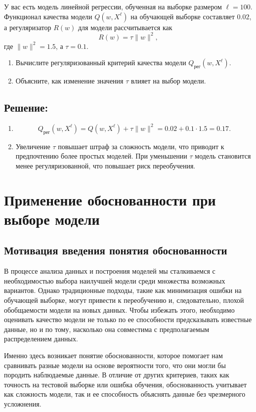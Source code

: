 У вас есть модель линейной регрессии, обученная на выборке размером $\ell = 100$. Функционал качества модели $Q(w, X^\ell)$ на обучающей выборке составляет $0.02$, а регуляризатор $R(w)$ для модели рассчитывается как 
\[
R(w) = \tau \|w\|^2,
\]
где $\|w\|^2 = 1.5$, а $\tau = 0.1$. 

\begin{enumerate}
    \item Вычислите регуляризованный критерий качества модели $Q_{\text{рег}}(w, X^\ell)$.
    \item Объясните, как изменение значения $\tau$ влияет на выбор модели.
\end{enumerate}

\subsection*{Решение:}

\begin{enumerate}
    \item
    \[
    Q_{\text{рег}}(w, X^\ell) = Q(w, X^\ell) + \tau \|w\|^2 = 0.02 + 0.1 \cdot 1.5 = 0.17.
    \]
    \item Увеличение $\tau$ повышает штраф за сложность модели, что приводит к предпочтению более простых моделей. При уменьшении $\tau$ модель становится менее регуляризованной, что повышает риск переобучения.
\end{enumerate}

\section{Применение обоснованности при выборе модели}

\subsection{Мотивация введения понятия обоснованности}

В процессе анализа данных и построения моделей мы сталкиваемся с необходимостью выбора наилучшей модели среди множества возможных вариантов. Однако традиционные подходы, такие как минимизация ошибки на обучающей выборке, могут привести к переобучению и, следовательно, плохой обобщаемости модели на новых данных. Чтобы избежать этого, необходимо оценивать качество модели не только по ее способности предсказывать известные данные, но и по тому, насколько она совместима с предполагаемым распределением данных.

Именно здесь возникает понятие обоснованности, которое помогает нам сравнивать разные модели на основе вероятности того, что они могли бы породить наблюдаемые данные. В отличие от других критериев, таких как точность на тестовой выборке или ошибка обучения, обоснованность учитывает как сложность модели, так и ее способность объяснять данные без чрезмерного усложнения.

